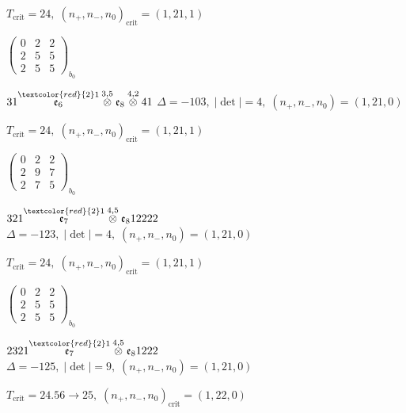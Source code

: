 \documentclass[10pt]{article}
\begin{document}
\hspace{1em}$T_{\text{crit}}=24,\; (n_+,n_-,n_0)_{\text{crit}}=(1,21,1)$

\hspace{2em}$\left(\begin{smallmatrix}0 & 2 & 2 \\ 2 & 5 & 5 \\ 2 & 5 & 5\end{smallmatrix}\right)_{\!b_0}$

\smallskip

$31\overset{\textcolor{red}{2}1}{\mathfrak{e}_6}\overset{3,5}{\otimes}\mathfrak{e}_8\overset{4,2}{\otimes}41$ \quad $\Delta=-103,\; |\det|=4,\; (n_+,n_-,n_0)=(1,21,0)$

\hspace{1em}$T_{\text{crit}}=24,\; (n_+,n_-,n_0)_{\text{crit}}=(1,21,1)$

\hspace{2em}$\left(\begin{smallmatrix}0 & 2 & 2 \\ 2 & 9 & 7 \\ 2 & 7 & 5\end{smallmatrix}\right)_{\!b_0}$

\smallskip

$321\overset{\textcolor{red}{2}1}{\mathfrak{e}_7}\overset{4,5}{\otimes}\mathfrak{e}_812222$ \quad $\Delta=-123,\; |\det|=4,\; (n_+,n_-,n_0)=(1,21,0)$

\hspace{1em}$T_{\text{crit}}=24,\; (n_+,n_-,n_0)_{\text{crit}}=(1,21,1)$

\hspace{2em}$\left(\begin{smallmatrix}0 & 2 & 2 \\ 2 & 5 & 5 \\ 2 & 5 & 5\end{smallmatrix}\right)_{\!b_0}$

\smallskip

$2321\overset{\textcolor{red}{2}1}{\mathfrak{e}_7}\overset{4,5}{\otimes}\mathfrak{e}_81222$ \quad $\Delta=-125,\; |\det|=9,\; (n_+,n_-,n_0)=(1,21,0)$

\hspace{1em}$T_{\text{crit}}=24.56 \to 25,\; (n_+,n_-,n_0)_{\text{crit}}=(1,22,0)$
\end{document}
